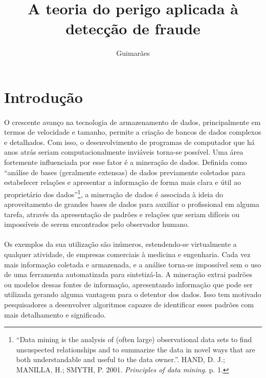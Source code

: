 \documentclass{iiufrgs}
\title{A teoria do perigo aplicada à detecção de fraude}
\author{Guimarães}{Bruno Barcarol}
\begin{document}
\maketitle
\newpage

\tableofcontents{}
\newpage

\section{Introdução}

\paragraph{}O crescente avanço na tecnologia de armazenamento de dados, principalmente em termos de velocidade e tamanho, permite a criação de bancos de dados complexos e detalhados. Com isso, o desenvolvimento de programas de computador que há anos atrás seriam computacionalmente inviáveis torna-se possível. Uma área fortemente influenciada por esse fator é a mineração de dados. Definida como ``análise de bases (geralmente extensas) de dados previamente coletados para estabelecer relações e apresentar a informação de forma mais clara e útil ao proprietário dos dados''\footnote{``Data mining is the analysis of (often large) observational data sets to find unsuspected relationships and to summarize the data in novel ways that are both understandable and useful to the data owner.''. HAND, D. J.; MANILLA, H.; SMYTH, P. 2001. \emph{Principles of data mining}. p. 1.}, a mineração de dados é associada à ideia do aproveitamento de grandes bases de dados para auxiliar o profissional em alguma tarefa, através da apresentação de padrões e relações que seriam difíceis ou impossíveis de serem encontrados pelo observador humano.

\paragraph{}Os exemplos da sua utilização são inúmeros, estendendo-se virtualmente a qualquer atividade, de empresas comerciais à medicina e engenharia. Cada vez mais informação coletada e armazenada, e a análise torna-se impossível sem o uso de uma ferramenta automatizada para sintetizá-la. A mineração extrai padrões ou modelos dessas fontes de informação, apresentando informação que pode ser utilizada gerando alguma vantagem para o detentor dos dados. Isso tem motivado pesquisadores a desenvolver algoritmos capazes de identificar esses padrões com mais detalhamento e significado.
\end{document}
